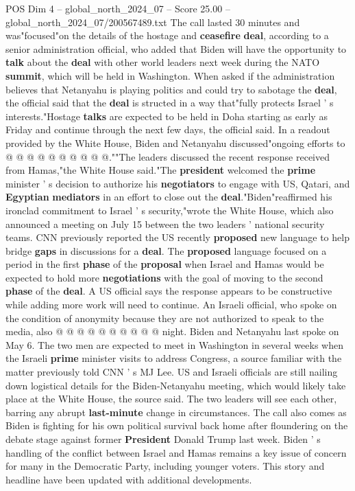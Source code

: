 \begin{textsample}{POS Dim 4 – global\_north\_2024\_07 – Score 25.00 – global\_north\_2024\_07/200567489.txt}
The call lasted 30 minutes and was"focused"on the details of the hostage and \textbf{ceasefire} \textbf{deal}, according to a senior administration official, who added that Biden will have the opportunity to \textbf{talk} about the \textbf{deal} with other world leaders next week during the NATO \textbf{summit}, which will be held in Washington.
When asked if the administration believes that Netanyahu is playing politics and could try to sabotage the \textbf{deal}, the official said that the \textbf{deal} is structed in a way that"fully protects Israel ' s interests."Hostage \textbf{talks} are expected to be held in Doha starting as early as Friday and continue through the next few days, the official said.
In a readout provided by the White House, Biden and Netanyahu discussed"ongoing efforts to @ @ @ @ @ @ @ @ @ @.""The leaders discussed the recent response received from Hamas,"the White House said."The \textbf{president} welcomed the \textbf{prime} minister ' s decision to authorize his \textbf{negotiators} to engage with US, Qatari, and \textbf{Egyptian} \textbf{mediators} in an effort to close out the \textbf{deal}."Biden"reaffirmed his ironclad commitment to Israel ' s security,"wrote the White House, which also announced a meeting on July 15 between the two leaders ' national security teams.
CNN previously reported the US recently \textbf{proposed} new language to help bridge \textbf{gaps} in discussions for a \textbf{deal}.
The \textbf{proposed} language focused on a period in the first \textbf{phase} of the \textbf{proposal} when Israel and Hamas would be expected to hold more \textbf{negotiations} with the goal of moving to the second \textbf{phase} of the \textbf{deal}.
A US official says the response appears to be constructive while adding more work will need to continue.
An Israeli official, who spoke on the condition of anonymity because they are not authorized to speak to the media, also @ @ @ @ @ @ @ @ @ @ night.
Biden and Netanyahu last spoke on May 6.
The two men are expected to meet in Washington in several weeks when the Israeli \textbf{prime} minister visits to address Congress, a source familiar with the matter previously told CNN ' s MJ Lee.
US and Israeli officials are still nailing down logistical details for the Biden-Netanyahu meeting, which would likely take place at the White House, the source said.
The two leaders will see each other, barring any abrupt \textbf{last-minute} change in circumstances.
The call also comes as Biden is fighting for his own political survival back home after floundering on the debate stage against former \textbf{President} Donald Trump last week.
Biden ' s handling of the conflict between Israel and Hamas remains a key issue of concern for many in the Democratic Party, including younger voters.
This story and headline have been updated with additional developments.

\end{textsample}
